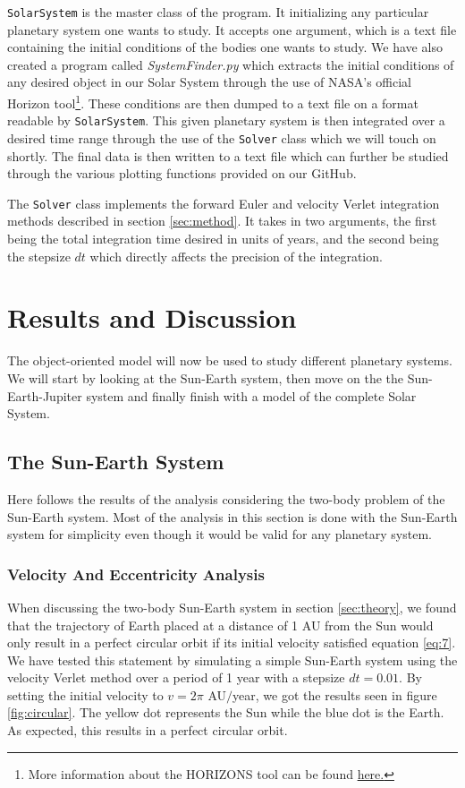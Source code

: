 \documentclass[a4paper, 10pt, reqno]{amsart}
\begin{document}
\texttt{SolarSystem} is the master class of the program. It initializing any particular planetary system one wants to study. It accepts one argument, which is a text file containing the initial conditions of the bodies one wants to study. We have also created a program called \textit{SystemFinder.py} which extracts the initial conditions of any desired object in our Solar System through the use of NASA's official Horizon tool\footnote{More information about the HORIZONS tool can be found \href{https://ssd.jpl.nasa.gov/horizons.cgi}{\color{blue}here.}}. These conditions are then dumped to a text file on a format readable by \texttt{SolarSystem}. This given planetary system is then integrated over a desired time range through the use of the \texttt{Solver} class which we will touch on shortly. The final data is then written to a text file which can further be studied through the various plotting functions provided on our GitHub.

The \texttt{Solver} class implements the forward Euler and velocity Verlet integration methods described in section \ref{sec:method}. It takes in two arguments, the first being the total integration time desired in units of years, and the second being the stepsize $dt$ which directly affects the precision of the integration. \\


\section{Results and Discussion}

The object-oriented model will now be used to study different planetary systems. We will start by looking at the Sun-Earth system, then move on the the Sun-Earth-Jupiter system and finally finish with a model of the complete Solar System.

\subsection{The Sun-Earth System}
Here follows the results of the analysis considering the two-body problem of the Sun-Earth system. Most of the analysis in this section is done with the Sun-Earth system for simplicity even though it would be valid for any planetary system.

\subsubsection{Velocity And Eccentricity Analysis} When discussing the two-body Sun-Earth system in section \ref{sec:theory}, we found that the trajectory of Earth placed at a distance of 1 AU from the Sun would only result in a perfect circular orbit if its initial velocity satisfied equation \ref{eq:7}. We have tested this statement by simulating a simple Sun-Earth system using the velocity Verlet method over a period of 1 year with a stepsize $dt = 0.01$. By setting the initial velocity to $v = 2\pi$ AU$/$year, we got the results seen in figure \ref{fig:circular}. The yellow dot represents the Sun while the blue dot is the Earth. As expected, this results in a perfect circular orbit.
\end{document}
